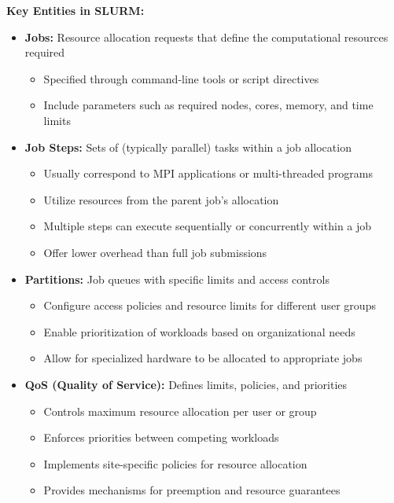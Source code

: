 \textbf{Key Entities in SLURM:}
\begin{itemize}
    \item \textbf{Jobs:} Resource allocation requests that define the computational resources required
    \begin{itemize}
        \item Specified through command-line tools or script directives
        \item Include parameters such as required nodes, cores, memory, and time limits
    \end{itemize}
    
    \item \textbf{Job Steps:} Sets of (typically parallel) tasks within a job allocation
    \begin{itemize}
        \item Usually correspond to MPI applications or multi-threaded programs
        \item Utilize resources from the parent job's allocation
        \item Multiple steps can execute sequentially or concurrently within a job
        \item Offer lower overhead than full job submissions
    \end{itemize}
    
    \item \textbf{Partitions:} Job queues with specific limits and access controls
    \begin{itemize}
        \item Configure access policies and resource limits for different user groups
        \item Enable prioritization of workloads based on organizational needs
        \item Allow for specialized hardware to be allocated to appropriate jobs
    \end{itemize}
    
    \item \textbf{QoS (Quality of Service):} Defines limits, policies, and priorities
    \begin{itemize}
        \item Controls maximum resource allocation per user or group
        \item Enforces priorities between competing workloads
        \item Implements site-specific policies for resource allocation
        \item Provides mechanisms for preemption and resource guarantees
    \end{itemize}
\end{itemize}

